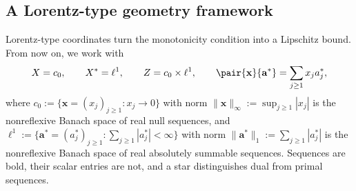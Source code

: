 \documentclass[11pt,a4paper]{article}
\theoremstyle{reportstyle}
\numberwithin{equation}{section}
\newcommand{\bx}{\mathbf x}
\newcommand{\ba}{\mathbf a}
\begin{document}
	\subsection{A Lorentz-type geometry framework}
	\label{sec:framework}
	Lorentz-type coordinates turn the monotonicity condition into a
	Lipschitz bound. From now on, we work with
	$$ X=c_0,\qquad X^*=\ell^1,\qquad Z=c_0\times\ell^1,
	\qquad \pair{\bx}{\ba^*}=\sum_{j\ge1}x_j a_j^*, $$
	where $c_0:=\{\mathbf{x}=(x_j)_{j\ge1}:x_j\to0\}$ with norm $\|\mathbf{x}\|_\infty := \sup_{j\ge1}|x_j|$ is the nonreflexive Banach space of real null sequences, and $\ell^1:=\{\mathbf{a}^* =(a_j^*)_{j\ge1} : \sum_{j\ge1}|a_j^*| < \infty\}$ with norm $\|\mathbf{a}^*\|_1:=\sum_{j\ge1}|a_j^*|$ is the nonreflexive Banach space of real absolutely summable sequences. Sequences are bold, their scalar entries are not, and a star distinguishes dual from primal sequences.
\end{document}

